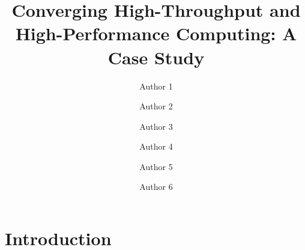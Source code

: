 \documentclass[sigconf, screen]{acmart}
\begin{document}
\title{Converging High-Throughput and High-Performance Computing: A Case Study}

\author{Author 1}

\author{Author 2}

\author{Author 3}

\author{Author 4}

\author{Author 5}

\author{Author 6}

\renewcommand{\shortauthors}{Author 1 et al.}

\begin{abstract}

\end{abstract}

%
%
\begin{CCSXML}
\end{CCSXML}



\maketitle

\section{Introduction}
\label{sec:intro}


\end{document}
